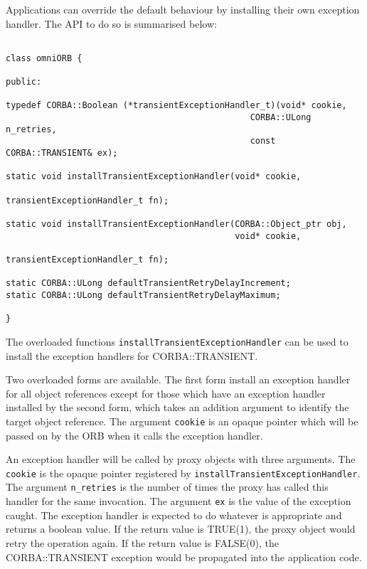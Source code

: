 \documentclass[11pt,twoside,onecolumn]{book}
\begin{document}
Applications can override the default behaviour by installing their own
exception handler. The API to do so is summarised below:

{\small
\begin{verbatim}

class omniORB {

public:
  
typedef CORBA::Boolean (*transientExceptionHandler_t)(void* cookie,
                                                CORBA::ULong n_retries,
                                                const CORBA::TRANSIENT& ex);

static void installTransientExceptionHandler(void* cookie,
                                             transientExceptionHandler_t fn);

static void installTransientExceptionHandler(CORBA::Object_ptr obj,
                                             void* cookie,
                                             transientExceptionHandler_t fn);
  
static CORBA::ULong defaultTransientRetryDelayIncrement;
static CORBA::ULong defaultTransientRetryDelayMaximum;

}

\end{verbatim}
}

The overloaded functions {\tt installTransientExceptionHandler}
can be used to install the exception handlers for CORBA::TRANSIENT.

Two overloaded forms are available. The first form install an
exception handler for all object references except for those which
have an exception handler installed by the second form, which takes
an addition argument to identify the target object reference.
The argument {\tt cookie} is an opaque pointer which will be passed
on by the ORB when it calls the exception handler.

An exception handler will be called by proxy objects with three
arguments. The {\tt cookie} is the opaque pointer registered by
{\tt installTransientExceptionHandler}. The argument {\tt n\_retries} is
the number of times the proxy has called this handler for the same
invocation. The argument {\tt ex} is the value of the exception caught.
The exception handler is expected to do whatever is appropriate and returns
a boolean value. If the return value is TRUE(1), the proxy object would
retry the operation again. If the return value is FALSE(0), the
CORBA::TRANSIENT exception would be propagated into the application code.
\end{document}
